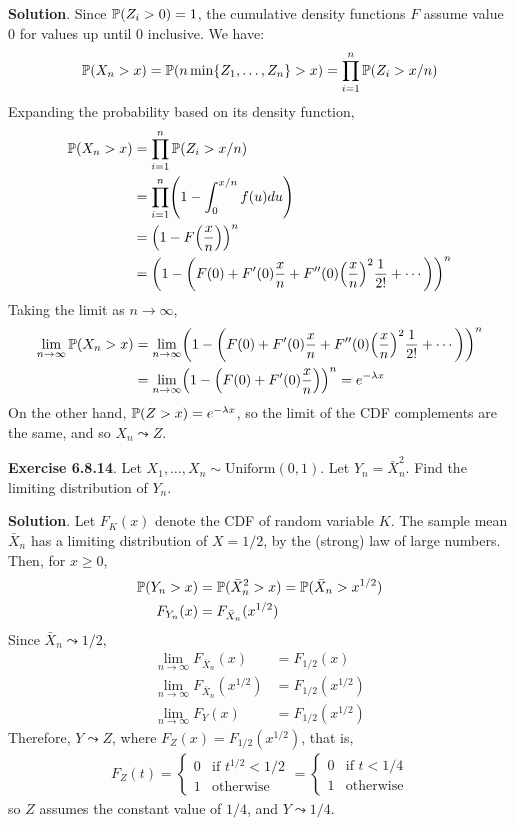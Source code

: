 \textbf{Solution}.
Since \(\operatorname{\mathbb{P}}(Z_{i} > 0) = 1\), the cumulative density functions
\(F\) assume value 0 for values up until 0 inclusive.
We have:
\[
\operatorname{\mathbb{P}}(X_{n} > x) = \operatorname{\mathbb{P}}(n \min\{Z_{1}, \dots, Z_{n}\} > x) = \prod _{i=1}^{n} \operatorname{\mathbb{P}}(Z_{i} > x/n)
\]
Expanding the probability based on its density function,
\begin{align*}
\PROB(X_{n} > x)
& = \prod _{i=1}^{n} \PROB(Z_{i} > x/n)
\\
& = \prod _{i=1}^{n} \left(1 - \int _{0}^{x/n} f(u) du \right)
\\
& = \left(1 - F\left(\frac{x}{n}\right) \right)^{n}
\\
& = \left(1 - \left(F(0) + F'(0)\frac{x}{n} + F''(0)\left(\frac{x}{n}\right)^{2}\frac{1}{2!} + \cdots \right)\right)^{n}
\end{align*}
Taking the limit as \(n \rightarrow \infty\),
\begin{align*}
\lim _{n \rightarrow \infty}\PROB(X_{n} > x)
& = \lim _{n \rightarrow \infty} \left(1 - \left(F(0) + F'(0)\frac{x}{n} + F''(0)\left(\frac{x}{n}\right)^{2}\frac{1}{2!} + \cdots \right)\right)^{n}
\\
& = \lim _{n \rightarrow \infty} \left(1 - \left(F(0) + F'(0)\frac{x}{n} \right)\right)^{n}
  = e^{-\lambda x}
\end{align*}
On the other hand, \(\operatorname{\mathbb{P}}(Z > x) = e^{-\lambda x}\), so the limit
of the CDF complements are the same, and so \(X_{n} \leadsto Z\).

\textbf{Exercise 6.8.14}. Let
\(X_{1}, \dots, X_{n} \sim \text{Uniform}(0, 1)\). Let
\(Y_{n} = \bar{X}_{n}^{2}\). Find the limiting distribution of \(Y_{n}\).

\textbf{Solution}.
Let \(F_K(x)\) denote the CDF of random variable \(K\).
The sample mean \(\bar{X}_{n}\) has a limiting distribution of
\(X = 1/2\), by the (strong) law of large numbers.
Then, for \(x \geq 0\),
\begin{align*}
\operatorname{\mathbb{P}}(Y_{n} > x) 
& = \operatorname{\mathbb{P}}(\bar{X}_{n}^{2} > x) = \operatorname{\mathbb{P}}(\bar{X}_{n} > x^{1/2})
\\
F_{Y_{n}}(x) 
& = F_{\bar{X}_{n}}(x^{1/2})
\end{align*}
Since \(\bar{X}_{n} \leadsto 1/2\),
\begin{align*}
\lim _{n \rightarrow \infty} F_{\bar{X}_{n}}(x) & = F_{1/2}(x) \\
\lim _{n \rightarrow \infty} F_{\bar{X}_{n}}(x^{1/2}) & = F_{1/2}(x^{1/2}) \\
\lim _{n \rightarrow \infty} F_{Y}(x) & = F_{1/2}(x^{1/2})
\end{align*}
Therefore, \(Y \leadsto Z\), where \(F_Z(x) = F_{1/2}(x^{1/2})\), that
is,
\begin{align*}  F_Z(t) =
    \begin{cases}
      0   & \text{if } t^{1/2} < 1/2 \\
      1 & \text{otherwise}
    \end{cases}   
  = \begin{cases}
      0   & \text{if } t < 1/4 \\
      1 & \text{otherwise}
    \end{cases}
\end{align*}
so \(Z\) assumes the constant value of \(1/4\), and \(Y \leadsto 1/4\).

